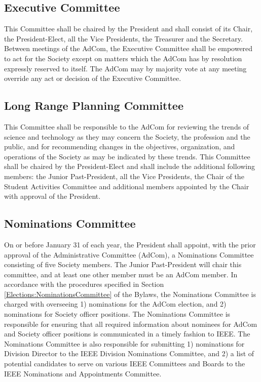 \documentclass[10pt]{article}
\newcommand{\secref}[1]{Section \ref{#1}}
\begin{document}
\subsection{Executive Committee}

This Committee shall be chaired by the President and shall consist of its Chair, the President-Elect, all the Vice Presidents, the Treasurer and the Secretary. Between meetings of the AdCom, the Executive Committee shall be empowered to act for the Society except on matters which the AdCom has by resolution expressly reserved to itself.  The AdCom may by majority vote at any meeting override any act or decision of the Executive Committee. 

\subsection{Long Range Planning Committee}

This Committee shall be responsible to the AdCom for reviewing the trends of science and technology as they may concern the Society, the profession and the public, and for recommending changes in the objectives, organization, and operations of the Society as may be indicated by these trends. This Committee shall be chaired by the President-Elect and shall include the additional following members: the Junior Past-President, all the Vice Presidents, the Chair of the Student Activities Committee and additional members appointed by the Chair with approval of the President.

\subsection{Nominations Committee}

On or before January 31 of each year, the President shall appoint, with the prior approval of the Administrative Committee (AdCom), a Nominations Committee consisting of five Society members. The Junior Past-President will chair this committee, and at least one other member must be an AdCom member. In accordance with the procedures specified in \secref{Elections:NominationsCommittee} of the Bylaws, the Nominations Committee is charged with overseeing 1) nominations for the AdCom election, and 2) nominations for Society officer positions. The Nominations Committee is responsible for ensuring that all required information about nominees for AdCom and Society officer positions is communicated in a timely fashion to IEEE. The Nominations Committee is also responsible for submitting 1) nominations for Division Director to the IEEE Division Nominations Committee, and 2) a list of potential candidates to serve on various IEEE Committees and Boards to the IEEE Nominations and Appointments Committee.
\end{document}
